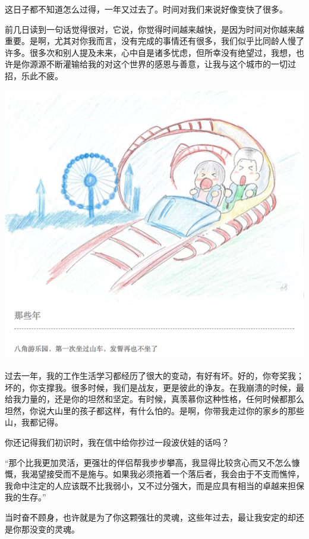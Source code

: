 \documentclass[]{book}
\begin{document}
这日子都不知道怎么过得，一年又过去了。时间对我们来说好像变快了很多。

前几日读到一句话觉得很对，它说，你觉得时间越来越快，是因为时间对你越来越重要。是啊，尤其对你我而言，没有完成的事情还有很多，我们似乎比同龄人慢了许多。很多次和别人提及未来，心中自是诸多忧虑，但所幸没有绝望过，我想，也许是你源源不断灌输给我的对这个世界的感恩与善意，让我与这个城市的一切过招，乐此不疲。

\includegraphics[width=8.33in]{images/wife4}

过去一年，我的工作生活学习都经历了很大的变动，有好有坏。好的，你夸奖我；坏的，你支撑我。很多时候，我们是战友，更是彼此的诤友。在我崩溃的时候，最给我力量的，还是你的坦然和坚定。有时候，真羡慕你这种性格，任何时候都那么坦然，你说大山里的孩子都这样，有什么怕的。是啊，你带我走过你的家乡的那些山，我都记得。

你还记得我们初识时，我在信中给你抄过一段波伏娃的话吗？

``那个比我更加灵活，更强壮的伴侣帮我步步攀高，我显得比较贪心而又不怎么慷慨，我渴望接受而不是施与。如果我必须拖着一个落后者，我会由于不支而憔悴，我命中注定的人应该既不比我弱小，又不过分强大，而是应具有相当的卓越来担保我的生存。''

当时奋不顾身，也许就是为了你这颗强壮的灵魂，这些年过去，最让我安定的却还是你那没变的灵魂。
\end{document}
